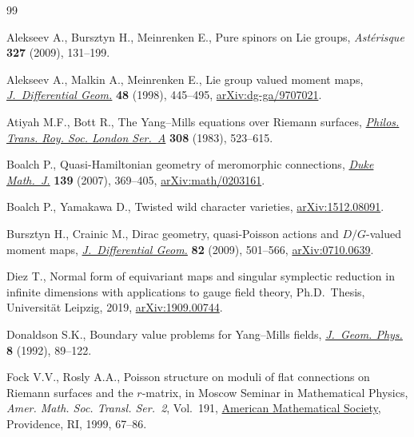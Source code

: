 \begin{thebibliography}{99}
\footnotesize\itemsep=0pt

Alekseev A., Bursztyn H., Meinrenken E., Pure spinors on {L}ie groups,
 \textit{Ast\'{e}risque} \textbf{327} (2009), 131--199.

Alekseev A., Malkin A., Meinrenken E., Lie group valued moment maps,
 \href{https://doi.org/10.4310/jdg/1214460860}{\textit{J.~Differential Geom.}}
 \textbf{48} (1998), 445--495,
 \href{https://arxiv.org/abs/dg-ga/9707021}{arXiv:dg-ga/9707021}.

Atiyah M.F., Bott R., The {Y}ang--{M}ills equations over {R}iemann surfaces,
 \href{https://doi.org/10.1098/rsta.1983.0017}{\textit{Philos. Trans. Roy.
 Soc. London Ser.~A}} \textbf{308} (1983), 523--615.

Boalch P., Quasi-{H}amiltonian geometry of meromorphic connections,
 \href{https://doi.org/10.1215/S0012-7094-07-13924-3}{\textit{Duke Math.~J.}}
 \textbf{139} (2007), 369--405,
 \href{https://arxiv.org/abs/math/0203161}{arXiv:math/0203161}.

Boalch P., Yamakawa D., Twisted wild character varieties,
 \href{https://arxiv.org/abs/1512.08091}{arXiv:1512.08091}.

Bursztyn H., Crainic M., Dirac geometry, quasi-{P}oisson actions and
 {$D/G$}-valued moment maps,
 \href{https://doi.org/10.4310/jdg/1251122545}{\textit{J.~Differential Geom.}}
 \textbf{82} (2009), 501--566,
 \href{https://arxiv.org/abs/0710.0639}{arXiv:0710.0639}.

Diez T., Normal form of equivariant maps and singular symplectic reduction in
 infinite dimensions with applications to gauge field theory, Ph.D.~Thesis,
 {U}niversit\"at {L}eipzig, 2019,
 \href{https://arxiv.org/abs/1909.00744}{arXiv:1909.00744}.

Donaldson S.K., Boundary value problems for {Y}ang--{M}ills fields,
 \href{https://doi.org/10.1016/0393-0440(92)90044-2}{\textit{J.~Geom. Phys.}}
 \textbf{8} (1992), 89--122.

Fock V.V., Rosly A.A., Poisson structure on moduli of flat connections on
 {R}iemann surfaces and the {$r$}-matrix, in Moscow {S}eminar in
 {M}athematical {P}hysics, \textit{Amer. Math. Soc. Transl. Ser.~2}, Vol.~191,
 \href{https://doi.org/10.1090/trans2/191/03}{American Mathematical Society},
 Providence, RI, 1999, 67--86.


\end{thebibliography}
